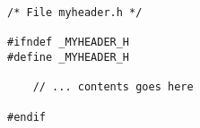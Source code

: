 \begin{lstlisting}[caption=Gebruik van een macro om een header-bestand één keer in te lezen.,label=cod:preheaderinc]
/* File myheader.h */

#ifndef _MYHEADER_H
#define _MYHEADER_H

    // ... contents goes here
    
#endif
\end{lstlisting}
